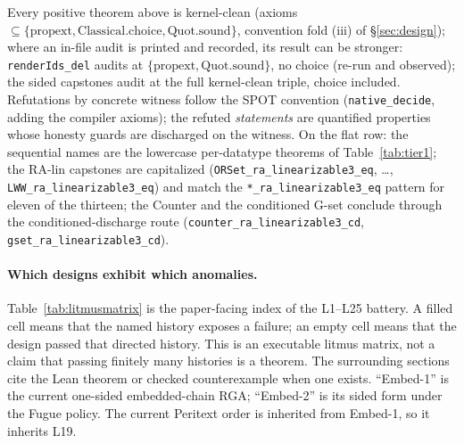 \documentclass[11pt]{article}
\newcommand{\code}[1]{\texttt{#1}}
\begin{document}
\noindent Every positive theorem above is kernel-clean (axioms
$\subseteq \{\mathrm{propext}, \mathrm{Classical.choice},
\mathrm{Quot.sound}\}$, convention fold (iii) of \S\ref{sec:design});
where an in-file audit is printed and recorded, its result can be
stronger: \code{renderIds\_del} audits at
$\{\mathrm{propext}, \mathrm{Quot.sound}\}$, no choice (re-run and
observed); the sided capstones audit at the full kernel-clean triple,
choice included. Refutations
by concrete witness follow the SPOT convention
(\code{native\_decide}, adding the compiler axioms); the refuted
\emph{statements} are quantified properties whose honesty guards are
discharged on the witness. On the flat row: the sequential names are
the lowercase per-datatype theorems of Table~\ref{tab:tier1}; the
RA-lin capstones are capitalized
(\code{ORSet\_ra\_linearizable3\_eq}, \dots,
\code{LWW\_ra\_linearizable3\_eq}) and match the
\code{*\_ra\_linearizable3\_eq} pattern for eleven of the thirteen;
the Counter and the conditioned G-set conclude through the
conditioned-discharge route (\code{counter\_ra\_linearizable3\_cd},
\code{gset\_ra\_linearizable3\_cd}).

\paragraph{Which designs exhibit which anomalies.}
Table~\ref{tab:litmusmatrix} is the paper-facing index of the L1--L25
battery. A filled cell means that the named history exposes a failure; an
empty cell means that the design passed that directed history. This is an
executable litmus matrix, not a claim that passing finitely many histories is
a theorem. The surrounding sections cite the Lean theorem or checked
counterexample when one exists. ``Embed-1'' is the current one-sided
embedded-chain RGA; ``Embed-2'' is its sided form under the Fugue policy.
The current Peritext order is inherited from Embed-1, so it inherits L19.
\end{document}
